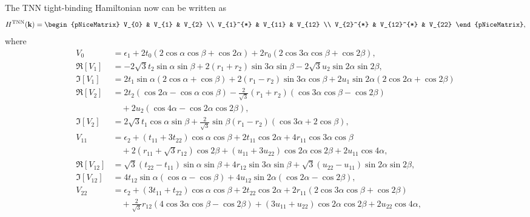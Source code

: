 The \ac{TNN} tight-binding Hamiltonian now can be written as
\begin{equation}
	\renewcommand{\arraystretch}{0.85}
	\begin{aligned}
		H^{\text{TNN}}(\mathbf{k})
		=
		\begin{pNiceMatrix}
			V_{0}     & V_{1}      & V_{2}  \\
			V_{1}^{*} & V_{11}     & V_{12} \\
			V_{2}^{*} & V_{12}^{*} & V_{22}
		\end{pNiceMatrix},
	\end{aligned}
\end{equation}
where
\begin{equation}
	\begin{aligned}
		V_0         & = \epsilon_1 + 2t_0 (2\cos\alpha\cos\beta + \cos2\alpha) + 2r_0 (2\cos3\alpha\cos\beta+\cos2\beta),                                       \\
		\Re[V_1]    & = -2\sqrt{3}t_2 \sin \alpha \sin \beta + 2(r_1 + r_2)\sin 3 \alpha \sin \beta - 2\sqrt{3} u_2 \sin 2\alpha \sin 2\beta,                      \\
		\Im[V_1]    & = 2 t_1 \sin \alpha (2 \cos \alpha +\cos \beta) + 2(r_1 - r_2) \sin 3\alpha \cos \beta + 2u_1 \sin 2\alpha (2\cos 2\alpha + \cos 2\beta)     \\
		\Re[V_2]    & = 2t_2 (\cos 2\alpha - \cos \alpha \cos \beta) -\frac{2}{\sqrt{3}} (r_1 + r_2 ) (\cos 3\alpha \cos \beta - \cos 2 \beta)                     \\&\quad + 2u_2 (\cos 4\alpha -\cos 2\alpha \cos 2\beta),\\
		\Im[V_2]    & = 2\sqrt{3} t_1 \cos \alpha \sin \beta +\frac{2}{\sqrt{3}} \sin \beta (r_1 -r_2 )(\cos 3\alpha + 2\cos \beta),                               \\
		V_{11}      & = \epsilon_2 + (t_{11}+3t_{22})\cos \alpha \cos \beta + 2 t_{11} \cos 2\alpha + 4r_{11} \cos 3\alpha \cos \beta                           \\ &\quad +2 (r_{11} + \sqrt{3} r_{12}) \cos 2\beta + (u_{11} + 3 u_{22})\cos 2 \alpha \cos 2\beta + 2 u_{11} \cos 4\alpha,\\
		\Re[V_{12}] & = \sqrt{3} (t_{22} - t_{11}) \sin \alpha \sin \beta +4 r_{12} \sin 3\alpha \sin \beta + \sqrt{3} (u_{22} - u_{11}) \sin 2\alpha \sin 2\beta, \\
		\Im[V_{12}] & = 4 t_{12} \sin \alpha (\cos \alpha -\cos \beta) + 4u_{12} \sin 2\alpha (\cos 2\alpha - \cos 2\beta),                                        \\
		V_{22}      & = \epsilon_2 +(3t_{11} + t_{22}) \cos \alpha \cos \beta + 2 t_{22} \cos 2 \alpha + 2 r_{11}(2\cos 3\alpha \cos \beta + \cos 2 \beta)      \\&\quad + \frac{2}{\sqrt{3}} r_{12} (4\cos 3\alpha \cos \beta - \cos 2\beta) + (3 u_{11} + u_{22}) \cos 2\alpha \cos 2\beta + 2u_{22} \cos 4\alpha,
	\end{aligned}
\end{equation}
